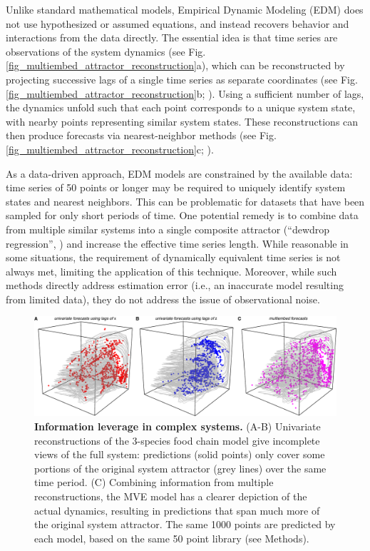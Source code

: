 Unlike standard mathematical models, Empirical Dynamic Modeling (EDM) does not use hypothesized or assumed equations, and instead recovers behavior and interactions from the data directly. The essential idea is that time series are observations of the system dynamics (see Fig. \ref{fig_multiembed_attractor_reconstruction}a), which can be reconstructed by projecting successive lags of a single time series as separate coordinates (see Fig. \ref{fig_multiembed_attractor_reconstruction}b; \cite{Crutchfield_1979, Packard_1980, Takens_1981}). Using a sufficient number of lags, the dynamics unfold such that each point corresponds to a unique system state, with nearby points representing similar system states. These reconstructions can then produce forecasts via nearest-neighbor methods (see Fig. \ref{fig_multiembed_attractor_reconstruction}c; \cite{Lorenz_1969, Sugihara_1990}).

As a data-driven approach, EDM models are constrained by the available data: time series of 50 points or longer may be required to uniquely identify system states and nearest neighbors. This can be problematic for datasets that have been sampled for only short periods of time. One potential remedy is to combine data from multiple similar systems into a single composite attractor (``dewdrop regression'', \cite{Hsieh_2008, Clark_2015}) and increase the effective time series length. While reasonable in some situations, the requirement of dynamically equivalent time series is not always met, limiting the application of this technique. Moreover, while such methods directly address estimation error (i.e., an inaccurate model resulting from limited data), they do not address the issue of observational noise.

\begin{figure}[!ht]
\begin{center}\includegraphics[width=\textwidth]{fig_multiembed_2.pdf}\end{center}
\caption[Information leverage in complex systems.]{\textbf{Information leverage in complex systems.}\newline
(A-B) Univariate reconstructions of the 3-species food chain model give incomplete views of the full system: predictions (solid points) only cover some portions of the original system attractor (grey lines) over the same time period. (C) Combining information from multiple reconstructions, the MVE model has a clearer depiction of the actual dynamics, resulting in predictions that span much more of the original system attractor. The same 1000 points are predicted by each model, based on the same 50 point library (see Methods).}\label{fig_multiembed_information_leverage}
\end{figure}


